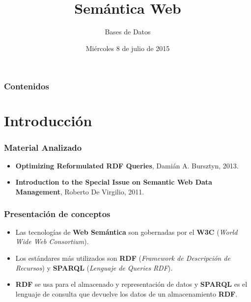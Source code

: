 \documentclass{beamer}
\title[Presentación del TP2]{Semántica Web} %
\author{Bases de Datos} %
\institute[] %
{
Federico Allocati, Sabrina Izcovich, Santiago Pernigotti, Germán Romano\\ %
\medskip
}
\date{Miércoles 8 de julio de 2015} %
\begin{document}
\begin{frame}
\titlepage %
\end{frame}

\begin{frame}
\frametitle{Contenidos} %
\tableofcontents %
\end{frame}


\section{Introducción} 
\begin{frame}
\frametitle{Material Analizado}
\begin{itemize}
\item \textbf{Optimizing Reformulated RDF Queries}, Damián A. Bursztyn, 2013.

\item \textbf{Introduction to the Special Issue on Semantic Web Data Management}, Roberto De Virgilio, 2011.
\end{itemize}
\end{frame}


\begin{frame}
\frametitle{Presentación de conceptos}
\begin{itemize}
\item Las tecnologías de \textbf{Web Semántica} son gobernadas por el \textbf{W3C} (\textit{World Wide Web Consortium}).

\item Los estándares más utilizados son \textbf{RDF} (\textit{Framework de Descripción de Recursos}) y \textbf{SPARQL} (\textit{Lenguaje de Queries RDF}).

\item \textbf{RDF} se usa para el almacenado y representación de datos y \textbf{SPARQL} es el lenguaje de consulta que devuelve los datos de un almacenamiento \textbf{RDF}.
\end{itemize}
\end{frame}
\end{document}
